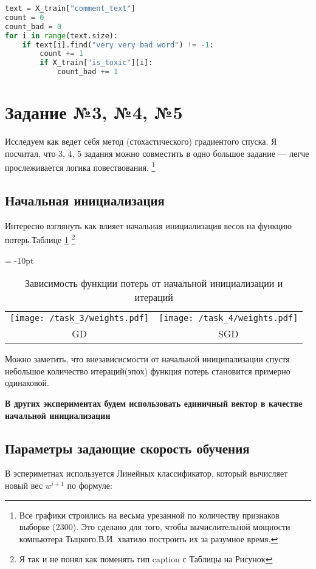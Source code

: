 \documentclass[12pt,fleqn]{article}
\begin{document}
\begin{lstlisting}[language=Python, caption=Count bad words, label=code:count_bad]
text = X_train["comment_text"]
count = 0
count_bad = 0
for i in range(text.size):
    if text[i].find("very very bad word") != -1:
        count += 1
        if X_train["is_toxic"][i]:
            count_bad += 1
\end{lstlisting}

\section{Задание №3, №4, №5}
Исследуем как ведет себя метод (стохастического) градиентого спуска. 
Я посчитал, что 3, 4, 5 задания можно совместить в одно большое задание --- легче прослеживается
логика повествования.
\footnote{Все графики строились на весьма урезанной по количеству признаков выборке (2300).
 Это сделано для того, чтобы вычислительной мощности компьютера Тыцкого.В.И. хватило построить
 их за разумное время.}

\subsection{Начальная инициализация}
Интересно взглянуть как влияет начальная инициализация весов на функцию потерь.Таблице \ref{pic:weights}
\footnote{Я так и не понял как поменять тип caption с Таблицы на Рисунок}
\newpage
\begin{table}[htb]
    \centering
    \tabcolsep = -10pt
    \begin{tabular}{cc}
        \texttt{[image: /task\_3/weights.pdf]}  & \texttt{[image: /task\_4/weights.pdf]} \\
        GD & SGD
    \end{tabular}
    \caption{Зависимость функции потерь от начальной инициализации и итераций}
    \label{pic:weights}
\end{table}

Можно заметить, что внезависисмости от начальной иниципализации спустя небольшое
количество итераций(эпох) функция потерь становится примерно одинаковой.

\textbf{В других экспериментах будем использовать единичный вектор в качестве начальной инициализации}
\subsection{Параметры задающие скорость обучения}
В эспериметнах используется Линейных классификатор, который вычисляет новый вес $w^{i+1}$ 
по формуле:
\end{document}
